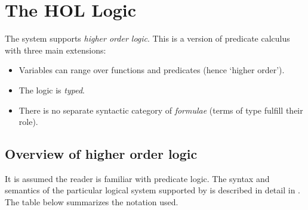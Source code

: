 \chapter{The HOL Logic}
\label{HOLlogic}

The \HOL{}  system  supports {\it  higher order  logic}.   This is  a version of
predicate calculus with three main extensions:

\begin{itemize}
\item Variables can range over functions and predicates
(hence `higher order').
\item The logic is {\it typed}.
\item There is no separate syntactic category of {\it formulae\/}
(terms of type  fulfill their role).
\end{itemize}

\section{Overview of higher order logic}

It is assumed the reader is familiar with predicate logic.  The syntax
and semantics of the particular logical system supported by \HOL{} is
described in detail in \DESCRIPTION.  The table below summarizes the
notation used.

